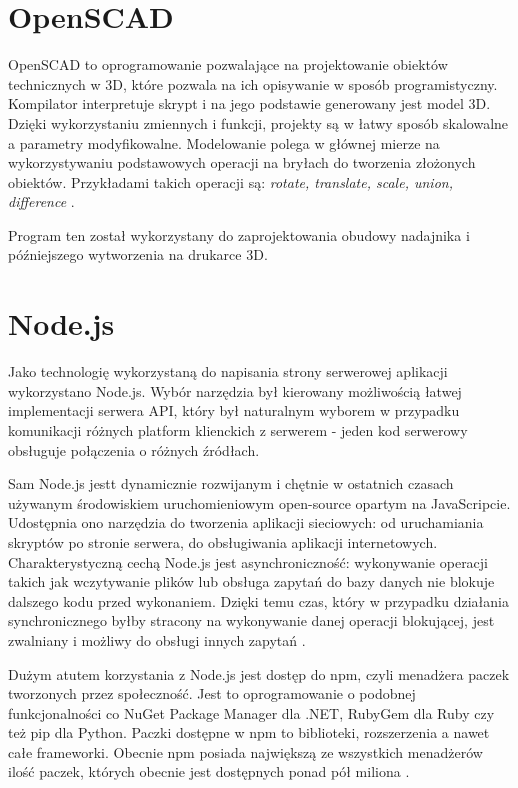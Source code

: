 \documentclass[eng,printmode]{mgr}
\begin{document}
\section{OpenSCAD}
OpenSCAD to oprogramowanie pozwalające na projektowanie obiektów technicznych w 3D, które pozwala na ich opisywanie w sposób programistyczny. Kompilator interpretuje skrypt i na jego podstawie generowany jest model 3D. Dzięki wykorzystaniu zmiennych i funkcji, projekty są w łatwy sposób skalowalne a parametry modyfikowalne. Modelowanie polega w głównej mierze na wykorzystywaniu podstawowych operacji na bryłach do tworzenia złożonych obiektów. Przykładami takich operacji są: \textit{rotate, translate, scale, union, difference} \cite{openscad}.

Program ten został wykorzystany do zaprojektowania obudowy nadajnika i późniejszego wytworzenia na drukarce 3D.


\section{Node.js}
Jako technologię wykorzystaną do napisania strony serwerowej aplikacji wykorzystano Node.js. Wybór narzędzia był kierowany możliwością łatwej implementacji serwera API, który był naturalnym wyborem w przypadku komunikacji różnych platform klienckich z serwerem - jeden kod serwerowy obsługuje połączenia o różnych źródłach.

Sam Node.js jestt dynamicznie rozwijanym i chętnie w ostatnich czasach używanym środowiskiem uruchomieniowym open-source opartym na JavaScripcie. Udostępnia ono narzędzia do tworzenia aplikacji sieciowych: od uruchamiania skryptów po stronie serwera, do obsługiwania aplikacji internetowych. Charakterystyczną cechą Node.js jest asynchroniczność: wykonywanie operacji takich jak wczytywanie plików lub obsługa zapytań do bazy danych nie blokuje dalszego kodu przed wykonaniem. Dzięki temu czas, który w przypadku działania synchronicznego byłby stracony na wykonywanie danej operacji blokującej, jest zwalniany i możliwy do obsługi innych zapytań \cite{nodejs_blocking}.

Dużym atutem korzystania z Node.js jest dostęp do npm, czyli menadżera paczek tworzonych przez społeczność. Jest to oprogramowanie o podobnej funkcjonalności co NuGet Package Manager dla .NET, RubyGem dla Ruby czy też pip dla Python. Paczki dostępne w npm to biblioteki, rozszerzenia a nawet całe frameworki. Obecnie npm posiada największą ze wszystkich menadżerów ilość paczek, których obecnie jest dostępnych ponad pół miliona \cite{module_counts}.
\end{document}
